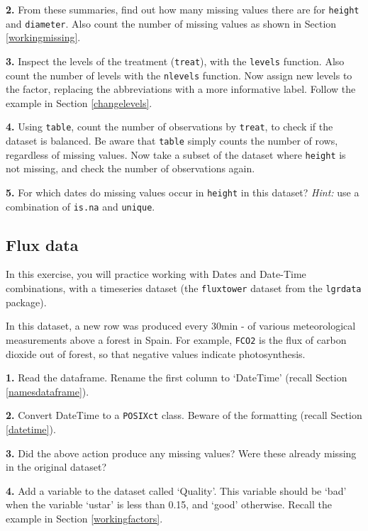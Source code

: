 \documentclass[]{book}
\begin{document}
\textbf{2.} From these summaries, find out how many missing values there are for \texttt{height} and \texttt{diameter}. Also count the number of missing values as shown in Section \ref{workingmissing}.

\textbf{3.} Inspect the levels of the treatment (\texttt{treat}), with the \texttt{levels} function. Also count the number of levels with the \texttt{nlevels} function. Now assign new levels to the factor, replacing the abbreviations with a more informative label. Follow the example in Section \ref{changelevels}.

\textbf{4.} Using \texttt{table}, count the number of observations by \texttt{treat}, to check if the dataset is balanced. Be aware that \texttt{table} simply counts the number of rows, regardless of missing values. Now take a subset of the dataset where \texttt{height} is not missing, and check the number of observations again.

\textbf{5.} For which dates do missing values occur in \texttt{height} in this dataset? \emph{Hint:} use a combination of \texttt{is.na} and \texttt{unique}.

\hypertarget{flux-data}{%
\subsection{Flux data}\label{flux-data}}

In this exercise, you will practice working with Dates and Date-Time combinations, with a timeseries dataset (the \texttt{fluxtower} dataset from the \texttt{lgrdata} package).

In this dataset, a new row was produced every 30min - of various meteorological measurements above a forest in Spain. For example, \texttt{FCO2} is the flux of carbon dioxide out of forest, so that negative values indicate photosynthesis.

\textbf{1.} Read the dataframe. Rename the first column to `DateTime' (recall Section \ref{namesdataframe}).

\textbf{2.} Convert DateTime to a \texttt{POSIXct} class. Beware of the formatting (recall Section \ref{datetime}).

\textbf{3.} Did the above action produce any missing values? Were these already missing in the original dataset?

\textbf{4.} Add a variable to the dataset called `Quality'. This variable should be `bad' when the variable `ustar' is less than 0.15, and `good' otherwise. Recall the example in Section \ref{workingfactors}.
\end{document}
